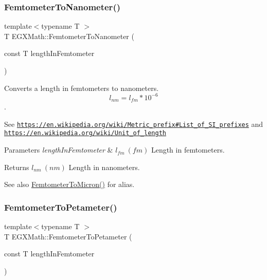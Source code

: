 \subsubsection{\texorpdfstring{Femtometer\+To\+Nanometer()}{FemtometerToNanometer()}}
{\footnotesize\ttfamily template$<$typename T $>$ \\
T E\+G\+X\+Math\+::\+Femtometer\+To\+Nanometer (\begin{DoxyParamCaption}\item[{const T}]{length\+In\+Femtometer }\end{DoxyParamCaption})}



Converts a length in femtometers to nanometers. \[ l_{nm}=l_{fm} * 10^{-6} \]. 

See \href{https://en.wikipedia.org/wiki/Metric_prefix#List_of_SI_prefixes}{\tt https\+://en.\+wikipedia.\+org/wiki/\+Metric\+\_\+prefix\#\+List\+\_\+of\+\_\+\+S\+I\+\_\+prefixes} and \href{https://en.wikipedia.org/wiki/Unit_of_length}{\tt https\+://en.\+wikipedia.\+org/wiki/\+Unit\+\_\+of\+\_\+length} 
\begin{DoxyParams}{Parameters}
{\em length\+In\+Femtometer} & $ l_{fm}\ (fm)$ Length in femtometers. \\
\hline
\end{DoxyParams}
\begin{DoxyReturn}{Returns}
$ l_{nm}\ (nm)$ Length in nanometers. 
\end{DoxyReturn}
\begin{DoxySeeAlso}{See also}
\mbox{\hyperlink{group___e_g_x_math-_conversions-_length_conversions-_s_i-_femtometer-_non-_s_i_gac1a358bdb9bf33dec3cb847cafe1bc71}{Femtometer\+To\+Micron()}} for alias. 
\end{DoxySeeAlso}
\mbox{\label{group___e_g_x_math-_conversions-_length_conversions-_s_i-_femtometer-_s_i_ga2145008022cfedfb81e40ceea426cda5}} 
\subsubsection{\texorpdfstring{Femtometer\+To\+Petameter()}{FemtometerToPetameter()}}
{\footnotesize\ttfamily template$<$typename T $>$ \\
T E\+G\+X\+Math\+::\+Femtometer\+To\+Petameter (\begin{DoxyParamCaption}\item[{const T}]{length\+In\+Femtometer }\end{DoxyParamCaption})}



